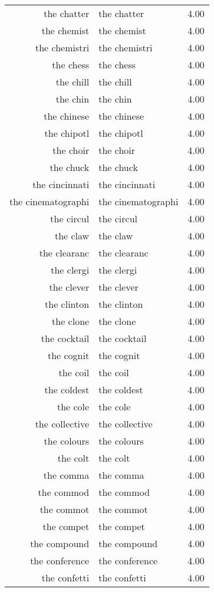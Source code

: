 \begin{table}[ht]
\begin{tabular}{rlr}
  the chatter & the chatter & 4.00 \\ 
  the chemist & the chemist & 4.00 \\ 
  the chemistri & the chemistri & 4.00 \\ 
  the chess & the chess & 4.00 \\ 
  the chill & the chill & 4.00 \\ 
  the chin & the chin & 4.00 \\ 
  the chinese & the chinese & 4.00 \\ 
  the chipotl & the chipotl & 4.00 \\ 
  the choir & the choir & 4.00 \\ 
  the chuck & the chuck & 4.00 \\ 
  the cincinnati & the cincinnati & 4.00 \\ 
  the cinematographi & the cinematographi & 4.00 \\ 
  the circul & the circul & 4.00 \\ 
  the claw & the claw & 4.00 \\ 
  the clearanc & the clearanc & 4.00 \\ 
  the clergi & the clergi & 4.00 \\ 
  the clever & the clever & 4.00 \\ 
  the clinton & the clinton & 4.00 \\ 
  the clone & the clone & 4.00 \\ 
  the cocktail & the cocktail & 4.00 \\ 
  the cognit & the cognit & 4.00 \\ 
  the coil & the coil & 4.00 \\ 
  the coldest & the coldest & 4.00 \\ 
  the cole & the cole & 4.00 \\ 
  the collective & the collective & 4.00 \\ 
  the colours & the colours & 4.00 \\ 
  the colt & the colt & 4.00 \\ 
  the comma & the comma & 4.00 \\ 
  the commod & the commod & 4.00 \\ 
  the commot & the commot & 4.00 \\ 
  the compet & the compet & 4.00 \\ 
  the compound & the compound & 4.00 \\ 
  the conference & the conference & 4.00 \\ 
  the confetti & the confetti & 4.00 \\ 

\end{tabular}
\end{table}

